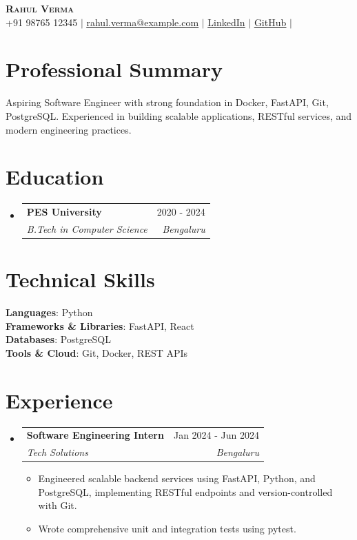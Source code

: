 \documentclass[letterpaper,10pt]{article}
\makeatletter
\newcommand{\resumeItem}[1]{
  \item\small{
    {#1 \vspace{-2pt}}
  }
}
\newcommand{\resumeSubheading}[4]{
  \vspace{-2pt}\item
    \begin{tabular*}{0.97\textwidth}[t]{l@{\extracolsep{\fill}}r}
      \textbf{#1} & #2 \\
      \textit{\small#3} & \textit{\small #4} \\
    \end{tabular*}\vspace{-7pt}
}
\newcommand{\resumeSubHeadingListStart}{\begin{itemize}[leftmargin=0.15in, label={}]}
\newcommand{\resumeSubHeadingListEnd}{\end{itemize}}
\newcommand{\resumeItemListStart}{\begin{itemize}}
\newcommand{\resumeItemListEnd}{\end{itemize}\vspace{-5pt}}
\makeatother
\begin{document}
\begin{center}
    \textbf{\Huge \scshape Rahul Verma} \\ \vspace{2pt}
    \small 
    +91 98765 12345 $|$     \href{mailto:rahul.verma@example.com}{\underline{rahul.verma@example.com}} $|$     \href{https://linkedin.com/in/rahulverma}{\underline{LinkedIn}} $|$     \href{https://github.com/rahulverma}{\underline{GitHub}} $|$     \end{center}

\section{Professional Summary}
\small{Aspiring Software Engineer with strong foundation in Docker, FastAPI, Git, PostgreSQL. Experienced in building scalable applications, RESTful services, and modern engineering practices.}
\vspace{2pt}

\section{Education}
  \resumeSubHeadingListStart
          \resumeSubheading
        {PES University}{2020 - 2024}
        {B.Tech in Computer Science}{Bengaluru}
      \resumeSubHeadingListEnd

\section{Technical Skills}
 \begin{itemize}[leftmargin=0.15in, label={}]
    \small{\item{
                        \textbf{Languages}: Python \\
                                \textbf{Frameworks & Libraries}: FastAPI, React \\
                                \textbf{Databases}: PostgreSQL \\
                                \textbf{Tools & Cloud}: Git, Docker, REST APIs \\
                                }}
 \end{itemize}

\section{Experience}
  \resumeSubHeadingListStart
          \resumeSubheading
        {Software Engineering Intern}{Jan 2024 - Jun 2024}
        {Tech Solutions}{Bengaluru}
        \resumeItemListStart
                      \resumeItem{Engineered scalable backend services using FastAPI, Python, and PostgreSQL, implementing RESTful endpoints and version-controlled with Git.}
                      \resumeItem{Wrote comprehensive unit and integration tests using pytest.}
                  \resumeItemListEnd
      \resumeSubHeadingListEnd
\end{document}
